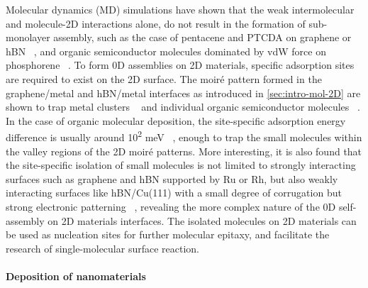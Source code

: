 Molecular dynamics (MD) simulations have shown that the weak
intermolecular and molecule-2D interactions alone, do not result in
the formation of sub-monolayer assembly, such as the case of pentacene
and PTCDA on graphene or hBN ~\cite{Zhao_2015_self_assemb_gr_MD}, and
organic semiconductor molecules dominated by vdW force on phosphorene
~\cite{Mukhopadhyay_2017_cryst_BP}.
% 
To form 0D assemblies on 2D materials, specific adsorption sites are
required to exist on the 2D surface.
% 
The moiré pattern formed in the graphene/metal and hBN/metal
interfaces as introduced in \autoref{sec:intro-mol-2D} are shown to
trap metal clusters
~\cite{Goriachko_2007_assembl_hBN_ru,Pan_2009_Pt_cluster_gr,Wang_2011_gr_hBN_metal_cl,Zhang_2014_metal_gr_Ru}
and individual organic semiconductor molecules
~\cite{Joshi_2014_TCNQ_hBN,Dil_2008_hBN_Rh,Lu_2012_c60_gr_moire}.
%
In the case of organic molecular deposition, the site-specific
adsorption energy difference is usually around 10\textsuperscript{2}
meV ~\cite{Lu_2012_c60_gr_moire}, enough to trap the small molecules
within the valley regions of the 2D moiré patterns. More interesting,
it is also found that the site-specific isolation of small molecules
is not limited to strongly interacting surfaces such as graphene and
hBN supported by Ru or Rh, but also weakly interacting surfaces like
hBN/Cu(111) with a small degree of corrugation but strong electronic
patterning ~\cite{Joshi_2012_hBN_Cu,Joshi_2014_TCNQ_hBN}, revealing the
more complex nature of the 0D self-assembly on 2D materials interfaces.
%
The isolated molecules on 2D materials can be used as nucleation sites
for further molecular epitaxy, and facilitate the research of
single-molecular surface reaction. 


\paragraph{Deposition of nano\-materials}



